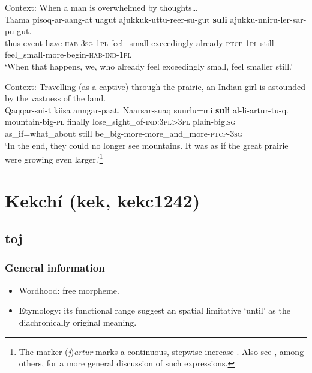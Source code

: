 \begin{exe}
	\ex Context: When a man is overwhelmed by thoughts…\\
	\gll Taama pisoq-ar-aang-at uagut ajukkuk-uttu-reer-su-gut \textbf{suli} ajukku-nniru-ler-sar-pu-gut.\\
	thus event-have-\textsc{hab}-3\textsc{sg} 1\textsc{pl} feel\_small-exceedingly-already-\textsc{ptcp}-1\textsc{pl} still feel\_small-more-begin-\textsc{hab}-\textsc{ind}-1\textsc{pl}\\
	\glt \lq When that happens, we, who already feel exceedingly small, feel smaller still.' \parencite[A shaman’s definition of poetry]{BittnerTexts}

	\ex Context: Travelling (as a captive) through the prairie, an Indian girl is astounded by the vastness of the land.\\
	\gll Qaqqar-sui-t kiisa anngar-paat. Naarsar-suaq suurlu=mi \textbf{suli} al-li-artur-tu-q.\\
	mountain-big-\textsc{pl} finally lose\_sight\_of-\textsc{ind}:3\textsc{pl}>3\textsc{pl} plain-big.\textsc{sg} as\_if=what\_about still be\_big-more-more\_and\_more-\textsc{ptcp}-3\textsc{sg}\\
	\glt \lq In the end, they could no longer see mountains. It was as if the great prairie were growing even larger.'\footnote{The marker \mbox{(\textit{j})\textit{artur}} marks a continuous, stepwise increase \parencite[282]{Fortescue1984}. Also see \textcite{vanGeenhoven2005}, among others, for a more general discussion of such expressions.}	\parencite[Naya Nuki: Niviarsiaraq qimaasuq]{BittnerTexts}
\end{exe}

\section{Kekchí (kek, kekc1242)}\label{appendixKekchi}
\subsection{toj}

\subsubsection{General information}
\begin{itemize}
	\item Wordhood: free morpheme.
	\item Etymology: its functional range suggest an spatial limitative \lq until\rq{ }as the diachronically original meaning.
\end{itemize}

